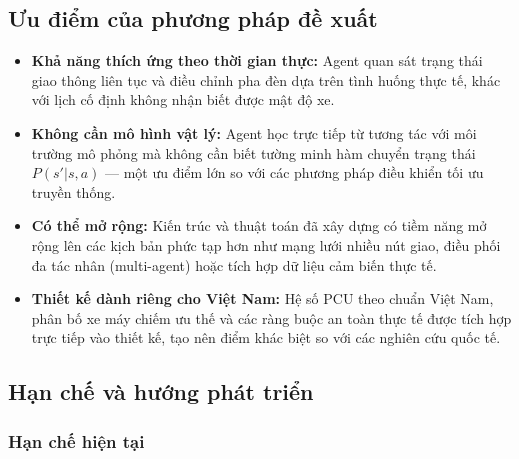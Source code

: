\subsection{Ưu điểm của phương pháp đề xuất}

\begin{itemize}
    \item \textbf{Khả năng thích ứng theo thời gian thực:} Agent quan sát trạng thái giao thông liên tục và điều chỉnh pha đèn dựa trên tình huống thực tế, khác với lịch cố định không nhận biết được mật độ xe.

    \item \textbf{Không cần mô hình vật lý:} Agent học trực tiếp từ tương tác với môi trường mô phỏng mà không cần biết tường minh hàm chuyển trạng thái $P(s'|s,a)$ --- một ưu điểm lớn so với các phương pháp điều khiển tối ưu truyền thống.

    \item \textbf{Có thể mở rộng:} Kiến trúc và thuật toán đã xây dựng có tiềm năng mở rộng lên các kịch bản phức tạp hơn như mạng lưới nhiều nút giao, điều phối đa tác nhân (multi-agent) hoặc tích hợp dữ liệu cảm biến thực tế.

    \item \textbf{Thiết kế dành riêng cho Việt Nam:} Hệ số PCU theo chuẩn Việt Nam, phân bố xe máy chiếm ưu thế và các ràng buộc an toàn thực tế được tích hợp trực tiếp vào thiết kế, tạo nên điểm khác biệt so với các nghiên cứu quốc tế.
\end{itemize}

\subsection{Hạn chế và hướng phát triển}

\subsubsection{Hạn chế hiện tại}

